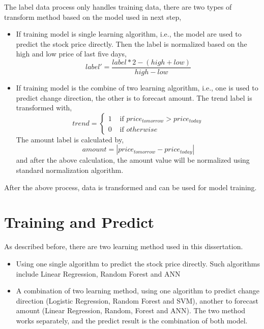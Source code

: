 The label data process only handles training data, there are two types of transform method based on the model used in next step,
\begin{itemize}
	\item If training model is single learning algorithm, i.e., the model are used to predict the stock price directly. Then the label is normalized based on the high and low price of last five days,
	\begin{equation}
		label'=\frac{label*2-(high + low)}{high - low}
	\end{equation}
	\item If training model is the combine of two learning algorithm, i.e., one is used to predict change direction, the other is to forecast amount. The trend label is transformed with,
	\begin{equation}
	trend=\begin{cases}
	1 & \text{ if } price_{tomorrow} > price_{today} \\ 
	0 & \text{ if } otherwise
	\end{cases}
	\end{equation}
	The amount label is calculated by,
	\begin{equation}
	amount=\left | price_{tomorrow} - price_{today} \right |
	\end{equation}
	and after the above calculation, the amount value will be normalized using standard normalization algorithm. 
\end{itemize}

After the above process, data is transformed and can be used for model training.


\section{Training and Predict}
As described before, there are two learning method used in this dissertation. 
\begin{itemize}
	\item Using one single algorithm to predict the stock price directly. Such algorithms include Linear Regression, Random Forest and ANN
	\item A combination of two learning method, using one algorithm to predict change direction (Logistic Regression, Random Forest and SVM), another to forecast amount (Linear Regression, Random, Forest and ANN). The two method works separately, and the predict result is the combination of both model.
\end{itemize}

